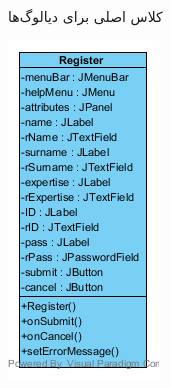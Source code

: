 \begin{figure}[H]
\begin{subfigure}[b]{0.3\textwidth}
			\caption{کلاس اصلی برای دیالوگ‌ها}
		\end{subfigure}
	\begin{subfigure}[b]{0.3\textwidth}
		\includegraphics[width=\textwidth]{img/class-design/ui/Register.png}

\end{subfigure}
\end{figure}
